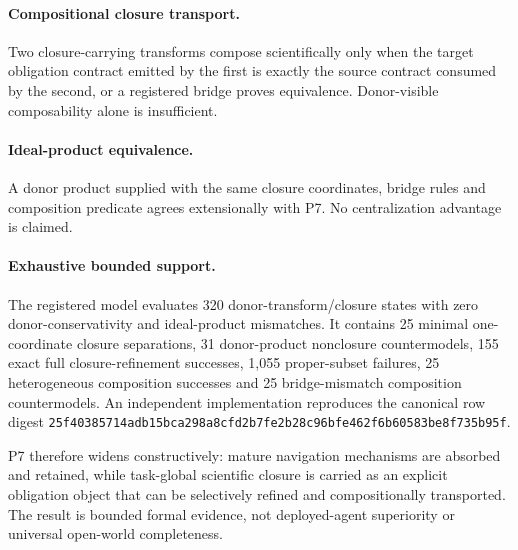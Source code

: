 \paragraph{Compositional closure transport.}
Two closure-carrying transforms compose scientifically only when the target obligation contract emitted by the first is exactly the source contract consumed by the second, or a registered bridge proves equivalence. Donor-visible composability alone is insufficient.

\paragraph{Ideal-product equivalence.}
A donor product supplied with the same closure coordinates, bridge rules and composition predicate agrees extensionally with P7. No centralization advantage is claimed.

\paragraph{Exhaustive bounded support.}
The registered model evaluates 320 donor-transform/closure states with zero donor-conservativity and ideal-product mismatches. It contains 25 minimal one-coordinate closure separations, 31 donor-product nonclosure countermodels, 155 exact full closure-refinement successes, 1,055 proper-subset failures, 25 heterogeneous composition successes and 25 bridge-mismatch composition countermodels. An independent implementation reproduces the canonical row digest \texttt{25f40385714adb15bca298a8cfd2b7fe2b28c96bfe462f6b60583be8f735b95f}.

P7 therefore widens constructively: mature navigation mechanisms are absorbed and retained, while task-global scientific closure is carried as an explicit obligation object that can be selectively refined and compositionally transported. The result is bounded formal evidence, not deployed-agent superiority or universal open-world completeness.
